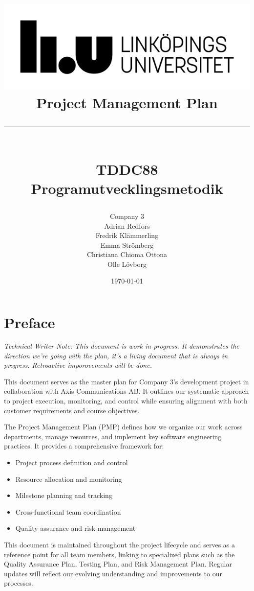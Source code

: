 \documentclass{article}
\title{
    \includegraphics[scale=1.5]{liu_logga.png} \\
    \vspace{2.0cm}
    \textbf{Project Management Plan} \\
    \rule{\textwidth}{0.4pt} \\
    \large \textbf{TDDC88 Programutvecklingsmetodik}
}
\author{Company 3 \\Adrian Redfors \\ Fredrik Klämmerling \\ Emma Strömberg \\ Christiana Chioma Ottona \\ Olle Lövborg}
\date{\today}
\begin{document}
\maketitle

\newpage
 
\newpage


\tableofcontents
\newpage


\section*{Preface}
\textit{Technical Writer Note: This document is work in progress. It demonstrates the direction we're going with the plan, it's a living document that is always in progress. Retroactive imporovements will be done.}

This document serves as the master plan for Company 3's development project in collaboration with Axis Communications AB. It outlines our systematic approach to project execution, monitoring, and control while ensuring alignment with both customer requirements and course objectives.

The Project Management Plan (PMP) defines how we organize our work across departments, manage resources, and implement key software engineering practices. It provides a comprehensive framework for:

\begin{itemize}
    \item Project process definition and control
    \item Resource allocation and monitoring
    \item Milestone planning and tracking
    \item Cross-functional team coordination
    \item Quality assurance and risk management
\end{itemize}

This document is maintained throughout the project lifecycle and serves as a reference point for all team members, linking to specialized plans such as the Quality Assurance Plan, Testing Plan, and Risk Management Plan. Regular updates will reflect our evolving understanding and improvements to our processes.

\newpage
\end{document}
